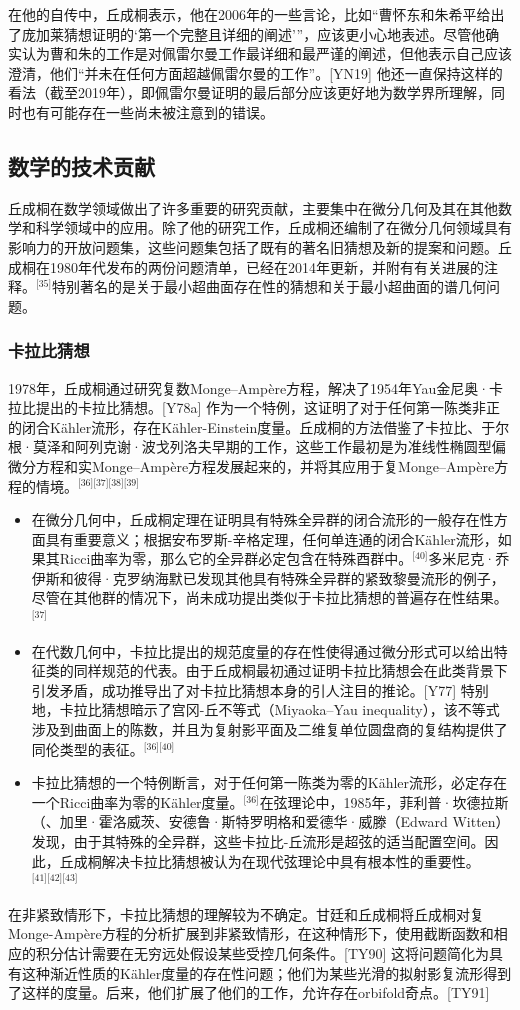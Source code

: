 在他的自传中，丘成桐表示，他在2006年的一些言论，比如“曹怀东和朱希平给出了庞加莱猜想证明的‘第一个完整且详细的阐述’”，应该更小心地表述。尽管他确实认为曹和朱的工作是对佩雷尔曼工作最详细和最严谨的阐述，但他表示自己应该澄清，他们“并未在任何方面超越佩雷尔曼的工作”。[YN19] 他还一直保持这样的看法（截至2019年），即佩雷尔曼证明的最后部分应该更好地为数学界所理解，同时也有可能存在一些尚未被注意到的错误。
\subsection{数学的技术贡献}
丘成桐在数学领域做出了许多重要的研究贡献，主要集中在微分几何及其在其他数学和科学领域中的应用。除了他的研究工作，丘成桐还编制了在微分几何领域具有影响力的开放问题集，这些问题集包括了既有的著名旧猜想及新的提案和问题。丘成桐在1980年代发布的两份问题清单，已经在2014年更新，并附有有关进展的注释。\(^\text{[35]}\)特别著名的是关于最小超曲面存在性的猜想和关于最小超曲面的谱几何问题。
\subsubsection{卡拉比猜想}
1978年，丘成桐通过研究复数Monge–Ampère方程，解决了1954年Yau金尼奥·卡拉比提出的卡拉比猜想。[Y78a] 作为一个特例，这证明了对于任何第一陈类非正的闭合Kähler流形，存在Kähler-Einstein度量。丘成桐的方法借鉴了卡拉比、于尔根·莫泽和阿列克谢·波戈列洛夫早期的工作，这些工作最初是为准线性椭圆型偏微分方程和实Monge–Ampère方程发展起来的，并将其应用于复Monge–Ampère方程的情境。\(^\text{[36][37][38][39]}\)
\begin{itemize}
\item 在微分几何中，丘成桐定理在证明具有特殊全异群的闭合流形的一般存在性方面具有重要意义；根据安布罗斯-辛格定理，任何单连通的闭合Kähler流形，如果其Ricci曲率为零，那么它的全异群必定包含在特殊酉群中。\(^\text{[40]}\)多米尼克·乔伊斯和彼得·克罗纳海默已发现其他具有特殊全异群的紧致黎曼流形的例子，尽管在其他群的情况下，尚未成功提出类似于卡拉比猜想的普遍存在性结果。\(^\text{[37]}\)
\item 在代数几何中，卡拉比提出的规范度量的存在性使得通过微分形式可以给出特征类的同样规范的代表。由于丘成桐最初通过证明卡拉比猜想会在此类背景下引发矛盾，成功推导出了对卡拉比猜想本身的引人注目的推论。[Y77] 特别地，卡拉比猜想暗示了宫冈-丘不等式（Miyaoka–Yau inequality），该不等式涉及到曲面上的陈数，并且为复射影平面及二维复单位圆盘商的复结构提供了同伦类型的表征。\(^\text{[36][40]}\)  
\item 卡拉比猜想的一个特例断言，对于任何第一陈类为零的Kähler流形，必定存在一个Ricci曲率为零的Kähler度量。\(^\text{[36]}\)在弦理论中，1985年，菲利普·坎德拉斯（、加里·霍洛威茨、安德鲁·斯特罗明格和爱德华·威滕（Edward Witten）发现，由于其特殊的全异群，这些卡拉比-丘流形是超弦的适当配置空间。因此，丘成桐解决卡拉比猜想被认为在现代弦理论中具有根本性的重要性。\(^\text{[41][42][43]}\)
\end{itemize}
在非紧致情形下，卡拉比猜想的理解较为不确定。甘廷和丘成桐将丘成桐对复Monge-Ampère方程的分析扩展到非紧致情形，在这种情形下，使用截断函数和相应的积分估计需要在无穷远处假设某些受控几何条件。[TY90] 这将问题简化为具有这种渐近性质的Kähler度量的存在性问题；他们为某些光滑的拟射影复流形得到了这样的度量。后来，他们扩展了他们的工作，允许存在orbifold奇点。[TY91]  

